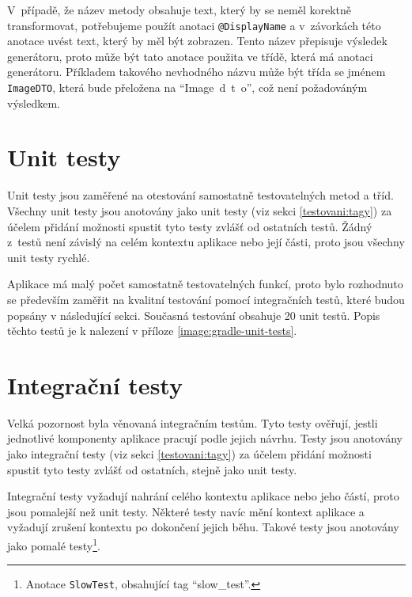     V~případě, že název metody obsahuje text, který by se neměl korektně transformovat, potřebujeme použít anotaci \verb|@DisplayName| a v~závorkách této anotace uvést text, který by měl být zobrazen. Tento název přepisuje výsledek generátoru, proto může být tato anotace použita ve třídě, která má anotaci generátoru. Příkladem takového nevhodného názvu může být třída se jménem \verb|ImageDTO|, která bude přeložena na \enquote{Image~d~t~o}, což není požadováným výsledkem.
    
\section{Unit testy}\label{testovani:unit}
    Unit testy jsou zaměřené na otestování samostatně testovatelných metod a tříd. Všechny unit testy jsou anotovány jako unit testy (viz sekci \ref{testovani:tagy}) za účelem přidání možnosti spustit tyto testy zvlášť od ostatních testů. Žádný z~testů není závislý na celém kontextu aplikace nebo její části, proto jsou všechny unit testy rychlé.
    
    Aplikace má malý počet samostatně testovatelných funkcí, proto bylo rozhodnuto se především zaměřit na kvalitní testování pomocí integračních testů, které budou popsány v následující sekci. Současná testování obsahuje 20 unit testů. Popis těchto testů je k nalezení v příloze \ref{image:gradle-unit-tests}.
    
\section{Integrační testy}\label{testovani:intergacni}
    Velká pozornost byla věnovaná integračním testům. Tyto testy ověřují, jestli jednotlivé komponenty aplikace pracují podle jejich návrhu. Testy jsou anotovány jako integrační testy (viz sekci \ref{testovani:tagy}) za účelem přidání možnosti spustit tyto testy zvlášť od ostatních, stejně jako unit testy. 
    
    Integrační testy vyžadují nahrání celého kontextu aplikace nebo jeho částí, proto jsou pomalejší než unit testy. Některé testy navíc mění kontext aplikace a vyžadují zrušení kontextu po dokončení jejich běhu. Takové testy jsou anotovány jako pomalé testy\footnote{Anotace \texttt{SlowTest}, obsahující tag \enquote{slow\_test}.}.
    
